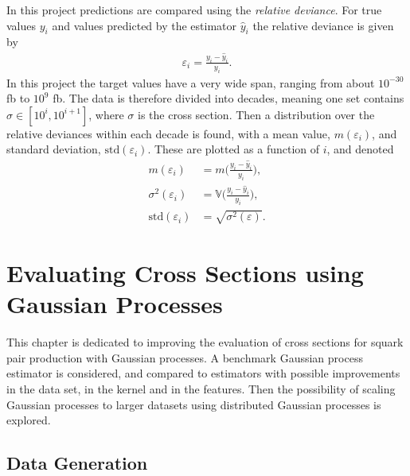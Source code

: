 \documentclass[twoside,english]{uiofysmaster}
\begin{document}
{In this project predictions are compared using the \textit{relative deviance}. For true values $y_i$ and values predicted by the estimator $\hat{y}_i$ the relative deviance is given by
\begin{align}\label{Eq:: gaussian process : Relative deviance}
\varepsilon_i = \frac{y_i - \hat{y}_i}{y_i}.
\end{align} 
In this project the target values have a very wide span, ranging from about $10^{-30}$ fb to $10^9$ fb. The data is therefore divided into decades, meaning one set contains $\sigma \in [10^i, 10^{i+1}]$, where $\sigma$ is the cross section. Then a distribution over the relative deviances within each decade is found, with a mean value, $m(\varepsilon_i)$, and standard deviation, $\mathrm{std}(\varepsilon_i)$. These are plotted as a function of $i$, and denoted
\begin{align}
m(\varepsilon_i) &= m \Big(\frac{y_i - \hat{y}_i}{y_i}\Big),\label{Eq:: gaussian process : rel deviance mean} \\
\sigma^2 (\varepsilon_i) &= \mathbb{V} \Big(\frac{y_i - \hat{y}_i}{y_i}\Big),\label{Eq:: gaussian process : rel deviance variance}\\
\mathrm{std}(\varepsilon_i) &= \sqrt{\sigma^2(\varepsilon)}.
\end{align} 







\chapter{Evaluating Cross Sections using Gaussian Processes}

This chapter is dedicated to improving the evaluation of cross sections for squark pair production with Gaussian processes. A benchmark Gaussian process estimator is considered, and compared to estimators with possible improvements in the data set, in the kernel and in the features. Then the possibility of scaling Gaussian processes to larger datasets using distributed Gaussian processes is explored.

\section{Data Generation}

}
\end{document}
